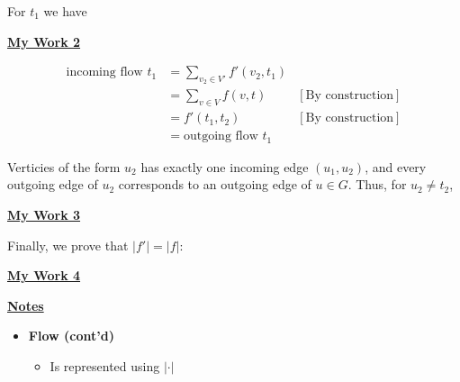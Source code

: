 \documentclass[12pt]{article}
\begin{document}
\begin{enumerate}[1.]
\begin{enumerate}[a)]
\begin{mdframed}
        \end{mdframed}

        \bigskip

        For $t_1$ we have

        \begin{mdframed}
        \underline{\textbf{My Work 2}}

        \bigskip

        \begin{align}
        \text{incoming flow $t_1$} &= \sum\limits_{v_2 \in V'} f'(v_2, t_1)\\
        &= \sum\limits_{v \in V} f(v, t) & [\text{By construction}]\\
        &= f'(t_1, t_2) & [\text{By construction}]\\
        &= \text{outgoing flow $t_1$}
        \end{align}

        \end{mdframed}

        \bigskip

        Verticies of the form $u_2$ has exactly one incoming edge $(u_1, u_2)$, and
        every outgoing edge of $u_2$ corresponds to an outgoing edge of $u \in G$. Thus,
        for $u_2 \neq t_2$,

        \begin{mdframed}
        \underline{\textbf{My Work 3}}

        \end{mdframed}

        \bigskip

        Finally, we prove that $\lvert f' \rvert = \lvert f \rvert$:

        \bigskip

        \begin{mdframed}
        \underline{\textbf{My Work 4}}

        \end{mdframed}

        \bigskip

        \underline{\textbf{Notes}}

        \bigskip

        \begin{itemize}
            \item \textbf{Flow (cont'd)}

            \begin{itemize}
                \item Is represented using $\lvert \cdot \rvert$


\end{itemize}
\end{itemize}
\end{enumerate}
\end{enumerate}
\end{document}
